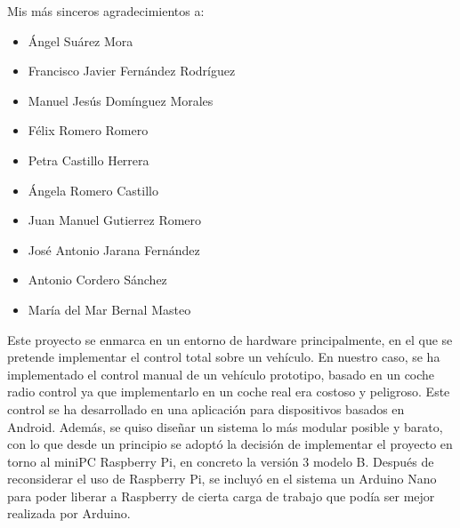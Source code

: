 \documentclass{pclass}
\begin{document}
\setlength{\parskip}{4ex}

\hacerportada

	
\frontmatter


Mis más sinceros agradecimientos a:

\begin{itemize}
	\item Ángel Suárez Mora
	\item Francisco Javier Fernández Rodríguez
	\item Manuel Jesús Domínguez Morales
	\item Félix Romero Romero
	\item Petra Castillo Herrera
	\item Ángela Romero Castillo
	\item Juan Manuel Gutierrez Romero
	\item José Antonio Jarana Fernández
	\item Antonio Cordero Sánchez
	\item María del Mar Bernal Masteo
	
\end{itemize}
 

Este proyecto se enmarca en un entorno de hardware principalmente, en el que se pretende implementar el control total sobre un vehículo. En nuestro caso, se ha implementado el control manual de un vehículo prototipo, basado en un coche radio control ya que implementarlo en un coche real era costoso y peligroso. Este control se ha desarrollado en una aplicación para dispositivos basados en Android. Además, se quiso diseñar un sistema lo más modular posible y barato, con lo que desde un principio se adoptó la decisión de implementar el proyecto en torno al miniPC Raspberry Pi, en concreto la versión 3 modelo B. Después de reconsiderar el uso de Raspberry Pi, se incluyó en el sistema un Arduino Nano para poder liberar a Raspberry de cierta carga de trabajo que podía ser mejor realizada por Arduino.
\end{document}
